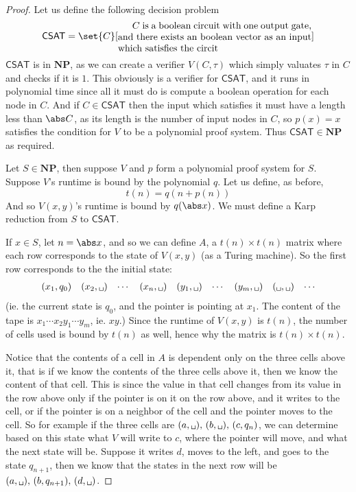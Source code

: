 \documentclass[10pt]{article}
\def\sps{\texttt{\char32}}
\def\NP{\mathbf{NP}}
\begin{document}
\begin{proof}

    \def\csat{\mathsf{CSAT}}
    Let us define the following decision problem
    \[ \csat = \set{C}[\vcenter{\advance\hsize by-5cm $C$ is a boolean circuit with one output gate, and there exists an boolean vector as an input which satisfies the circit}] \]
    $\csat$ is in $\NP$, as we can create a verifier $V(C,\tau)$ which simply valuates $\tau$ in $C$ and checks if it is $1$.
    This obviously is a verifier for $\csat$, and it runs in polynomial time since all it must do is compute a boolean operation for each node in $C$.
    And if $C\in\csat$ then the input which satisfies it must have a length less than $\abs C$, as its length is the number of input nodes in $C$, so $p(x)=x$ satisfies the condition for $V$ to be a
    polynomial proof system.
    Thus $\csat\in\NP$ as required.

    Let $S\in\NP$, then suppose $V$ and $p$ form a polynomial proof system for $S$.
    Suppose $V$'s runtime is bound by the polynomial $q$.
    Let us define, as before,
    \[ t(n) = q(n+p(n)) \]
    And so $V(x,y)$'s runtime is bound by $q(\abs x)$.
    We must define a Karp reduction from $S$ to $\csat$.

    If $x\in S$, let $n=\abs x$, and so we can define $A$, a $t(n)\times t(n)$ matrix where each row corresponds to the state of $V(x,y)$ (as a Turing machine). 
    So the first row corresponds to the the initial state:
    \[ \begin{matrix} (x_1,q_0) & (x_2,\sps) & \cdots & (x_n,\sps) & (y_1,\sps) & \cdots & (y_m,\sps) & (\sps,\sps) & \cdots \end{matrix} \]
    (ie. the current state is $q_0$, and the pointer is pointing at $x_1$.
    The content of the tape is $x_1\cdots x_2y_1\cdots y_m$, ie. $xy$.)
    Since the runtime of $V(x,y)$ is $t(n)$, the number of cells used is bound by $t(n)$ as well, hence why the matrix is $t(n)\times t(n)$.

    Notice that the contents of a cell in $A$ is dependent only on the three cells above it, that is if we know the contents of the three cells above it, then we know the content of that cell.
    This is since the value in that cell changes from its value in the row above only if the pointer is on it on the row above, and it writes to the cell, or if the pointer is on a neighbor of the cell
    and the pointer moves to the cell.
    So for example if the three cells are $(a,\sps),\,(b,\sps),\,(c,q_n)$, we can determine based on this state what $V$ will write to $c$, where the pointer will move, and what the next state will be.
    Suppose it writes $d$, moves to the left, and goes to the state $q_{n+1}$, then  we know that the states in the next row will be $(a,\sps),\,(b,q_{n+1}),\,(d,\sps)$.


\end{proof}
\end{document}
